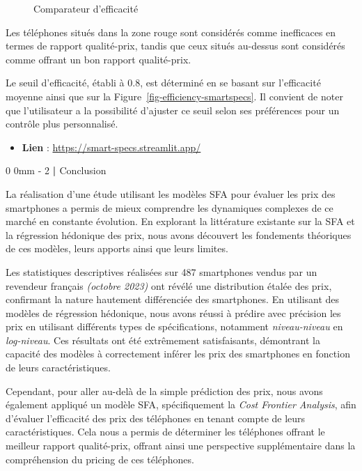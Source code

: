 \documentclass[
  12pt,
]{report}
\makeatletter
\providecommand{\tightlist}{%
  \setlength{\itemsep}{0pt}\setlength{\parskip}{0pt}}\usepackage{longtable,booktabs,array}
\renewcommand{\texttt}[1]{\colorbox{light}{\color{highlight}{\ttfamily{#1}}}}
\renewcommand{\chapter}{%
    \clearpage %
    \@startsection{chapter}%
    {0} %
    {0mm} %
    {-\baselineskip} %
    {2\baselineskip} %
    {\normalfont\Huge\bfseries | \Huge\bfseries}%
}
\makeatother
\begin{document}
\begin{figure}[htbp]
    \centering
    \texttt{[image: imgs/graphefficacité.jpg]}
    \caption{Comparateur d'efficacité}
    \label{fig:example}
\end{figure}

Les téléphones situés dans la zone rouge sont considérés comme
inefficaces en termes de rapport qualité-prix, tandis que ceux situés
au-dessus sont considérés comme offrant un bon rapport qualité-prix.

Le seuil d'efficacité, établi à 0.8, est déterminé en se basant sur
l'efficacité moyenne ainsi que sur la
Figure~\ref{fig-efficiency-smartspecs}. Il convient de noter que
l'utilisateur a la possibilité d'ajuster ce seuil selon ses préférences
pour un contrôle plus personnalisé.

\begin{itemize}
\tightlist
\item
  \textbf{Lien} : \url{https://smart-specs.streamlit.app/}
\end{itemize}

\chapter{Conclusion}\label{conclusion-2}

La réalisation d'une étude utilisant les modèles SFA pour évaluer les
prix des smartphones a permis de mieux comprendre les dynamiques
complexes de ce marché en constante évolution. En explorant la
littérature existante sur la SFA et la régression hédonique des prix,
nous avons découvert les fondements théoriques de ces modèles, leurs
apports ainsi que leurs limites.

Les statistiques descriptives réalisées sur 487 smartphones vendus par
un revendeur français \emph{(octobre 2023)} ont révélé une distribution
étalée des prix, confirmant la nature hautement différenciée des
smartphones. En utilisant des modèles de régression hédonique, nous
avons réussi à prédire avec précision les prix en utilisant différents
types de spécifications, notamment \emph{niveau-niveau} en
\emph{log-niveau}. Ces résultats ont été extrêmement satisfaisants,
démontrant la capacité des modèles à correctement inférer les prix des
smartphones en fonction de leurs caractéristiques.

Cependant, pour aller au-delà de la simple prédiction des prix, nous
avons également appliqué un modèle SFA, spécifiquement la \emph{Cost
Frontier Analysis}, afin d'évaluer l'efficacité des prix des téléphones
en tenant compte de leurs caractéristiques. Cela nous a permis de
déterminer les téléphones offrant le meilleur rapport qualité-prix,
offrant ainsi une perspective supplémentaire dans la compréhension du
pricing de ces téléphones.
\end{document}

